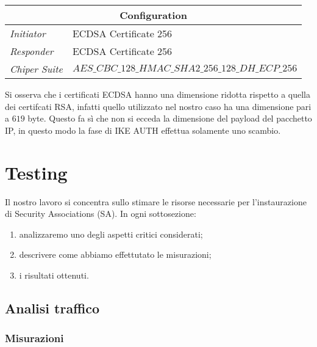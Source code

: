 \documentclass[
10pt, %
a4paper, %
oneside, %
headinclude,footinclude, %
BCOR5mm, %
]{scrartcl}
\begin{document}
\begin{center}
    \setlength{\arrayrulewidth}{0.4mm}
    \renewcommand{\arraystretch}{1.3}
    \begin{tabular}{|l|l|}
        \hline
        \multicolumn{2}{|c|}{\textbf{Configuration}} \\
        \hline
        \textit{Initiator} & ECDSA Certificate 256\\
        \textit{Responder} & ECDSA Certificate 256 \\
        \textit{Chiper Suite} & $AES\_CBC\_128\_HMAC\_SHA2\_256\_128\_DH\_ECP\_256$ \\
        \hline
    \end{tabular}
\end{center}
\vspace*{0.2cm}
\noindent
Si osserva che i certificati ECDSA hanno una dimensione ridotta rispetto a quella dei certifcati RSA, infatti quello utilizzato nel
nostro caso ha una dimensione pari a $619$ byte. Questo fa sì che non si ecceda la dimensione del payload del pacchetto IP, in questo
modo la fase di IKE AUTH effettua solamente uno scambio.


\newpage
\section{Testing}

Il nostro lavoro si concentra sullo stimare le risorse necessarie per l'instaurazione di Security Associations (SA). In ogni sottosezione:
\begin{enumerate}
    \item analizzaremo uno degli aspetti critici considerati;
    \item descrivere come abbiamo effettutato le misurazioni;
    \item i risultati ottenuti.
\end{enumerate}


\subsection{Analisi traffico}

\subsubsection{Misurazioni}
\end{document}
